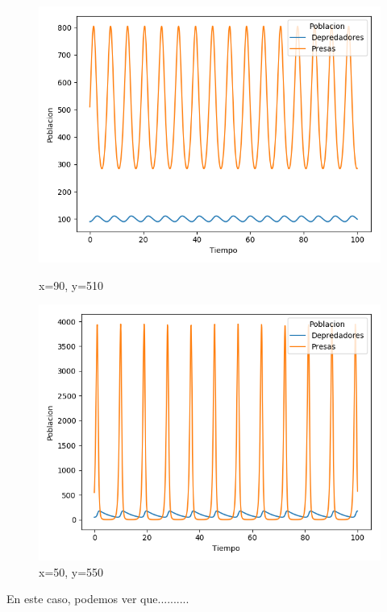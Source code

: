 \documentclass[11pt,a4paper]{article}
\begin{document}
\begin{figure}[H]
	\centering
	\begin{minipage}{0.5\textwidth}
	  \centering
	  \includegraphics[scale=0.4]{img/2-90-510.png}
	  \caption{x=90,  y=510}
	\end{minipage}%
	\begin{minipage}{0.5\textwidth}
	  \centering
	  \includegraphics[scale=0.4]{img/2-50-550.png}
	  \caption{x=50,  y=550}
	\end{minipage}
\end{figure}

En este caso, podemos ver que..........
\end{document}
